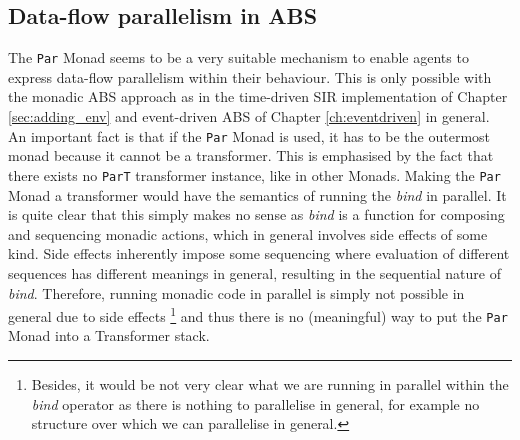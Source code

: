 \subsection{Data-flow parallelism in ABS}
The \texttt{Par} Monad seems to be a very suitable mechanism to enable agents to express data-flow parallelism within their behaviour. This is only possible with the monadic ABS approach as in the time-driven SIR implementation of Chapter \ref{sec:adding_env} and event-driven ABS of Chapter \ref{ch:eventdriven} in general. An important fact is that if the \texttt{Par} Monad is used, it has to be the outermost monad because it cannot be a transformer. This is emphasised by the fact that there exists no \texttt{ParT} transformer instance, like in other Monads. Making the \texttt{Par} Monad a transformer would have the semantics of running the \textit{bind} in parallel. It is quite clear that this simply makes no sense as \textit{bind} is a function for composing and sequencing monadic actions, which in general involves side effects of some kind. Side effects inherently impose some sequencing where evaluation of different sequences has different meanings in general, resulting in the sequential nature of \textit{bind}. Therefore, running monadic code in parallel is simply not possible in general due to side effects \footnote{Besides, it would be not very clear what we are running in parallel within the \textit{bind} operator as there is nothing to parallelise in general, for example no structure over which we can parallelise in general.} and thus there is no (meaningful) way to put the \texttt{Par} Monad into a Transformer stack.